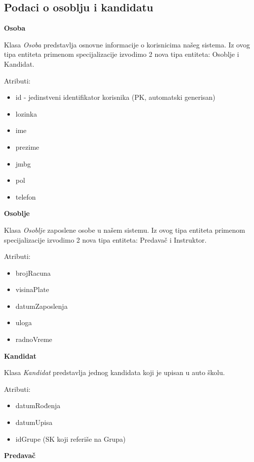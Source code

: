 \subsection{Podaci o osoblju i kandidatu}

\textbf{\large Osoba}
\vspace{0.3cm}

Klasa \textit{Osoba} predstavlja osnovne informacije o korisnicima našeg sistema. Iz ovog tipa entiteta primenom specijalizacije izvodimo 2 nova tipa entiteta: Osoblje i Kandidat.

Atributi:
\begin{itemize}
    \item id - jedinstveni identifikator korisnika (PK, automatski generisan)
    \item lozinka 
    \item ime
    \item prezime
    \item jmbg
    \item pol
    \item telefon
\end{itemize}

\textbf{\large Osoblje}
\vspace{0.3cm}

Klasa \textit{Osoblje} zaposlene osobe u našem sistemu. Iz ovog tipa entiteta primenom specijalizacije izvodimo 2 nova tipa entiteta: Predavač i Instruktor.

Atributi:
\begin{itemize}
    \item brojRacuna
    \item visinaPlate
    \item datumZaposlenja
    \item uloga
    \item radnoVreme
\end{itemize}

\textbf{\large Kandidat}
\vspace{0.3cm}

Klasa \textit{Kandidat} predstavlja jednog kandidata koji je upisan u auto školu.

Atributi:
\begin{itemize}
    \item datumRođenja
    \item datumUpisa
    \item idGrupe (SK koji referiše na Grupa)
\end{itemize}

\textbf{\large Predavač}
\vspace{0.3cm}


